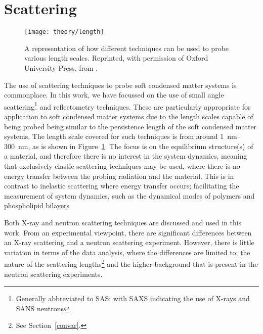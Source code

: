 \section{Scattering}
\label{sec:scattering}
%
\begin{figure}
    \centering
    \texttt{[image: theory/length]}
    \caption{A representation of how different techniques can be used to probe various length scales. Reprinted, with permission of Oxford University Press, from \cite{sivia_elementary_2011}.}
    \label{fig:lengths}
\end{figure}
%
The use of scattering techniques to probe soft condensed matter systems is commonplace.
In this work, we have focussed on the use of small angle scattering\footnote{Generally abbreviated to SAS; with SAXS indicating the use of X-rays and SANS neutrons} and reflectometry techniques.
These are particularly appropriate for application to soft condensed matter systems due to the length scales capable of being probed being similar to the persistence length of the soft condensed matter systems.
The length scale covered for such techniques is from around \SIrange{1}{300}{\nano\metre}, as is shown in Figure~\ref{fig:lengths}.
The focus is on the equilibrium structure(s) of a material, and therefore there is no interest in the system dynamics, meaning that exclusively elastic scattering techniques may be used, where there is no energy transfer between the probing radiation and the material.
This is in contrast to inelastic scattering where energy transfer occurs; facilitating the measurement of system dynamics, such as the dynamical modes of polymers and phospholipid bilayers\autocite{garcia_sakai_quasielastic_2009, farago_recent_2009}

Both X-ray and neutron scattering techniques are discussed and used in this work.
From an experimental viewpoint, there are significant differences between an X-ray scattering and a neutron scattering experiment.
However, there is little variation in terms of the data analysis, where the differences are limited to; the nature of the scattering lengths\footnote{See Section~\ref{convar}.} and the higher background that is present in the neutron scattering experiments.

